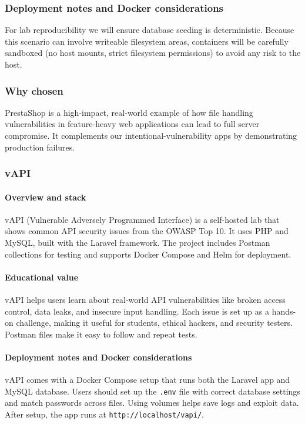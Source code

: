 \documentclass[12pt]{article}
\begin{document}
\subsubsection*{Deployment notes and Docker considerations}
For lab reproducibility we will ensure database seeding is deterministic. Because this scenario can involve writeable filesystem areas, containers will be carefully sandboxed (no host mounts, strict filesystem permissions) to avoid any risk to the host.

\subsubsection*{Why chosen}
PrestaShop is a high-impact, real-world example of how file handling vulnerabilities in feature-heavy web applications can lead to full server compromise. It complements our intentional-vulnerability apps by demonstrating production failures.

\subsubsection{vAPI}

\paragraph{Overview and stack}
vAPI (Vulnerable Adversely Programmed Interface) is a self-hosted lab that shows common API security issues from the OWASP Top 10. It uses PHP and MySQL, built with the Laravel framework. The project includes Postman collections for testing and supports Docker Compose and Helm for deployment.

\paragraph{Educational value}
vAPI helps users learn about real-world API vulnerabilities like broken access control, data leaks, and insecure input handling. Each issue is set up as a hands-on challenge, making it useful for students, ethical hackers, and security testers. Postman files make it easy to follow and repeat tests.

\paragraph{Deployment notes and Docker considerations}
vAPI comes with a Docker Compose setup that runs both the Laravel app and MySQL database. Users should set up the \texttt{.env} file with correct database settings and match passwords across files. Using volumes helps save logs and exploit data. After setup, the app runs at \texttt{http://localhost/vapi/}.
\end{document}
